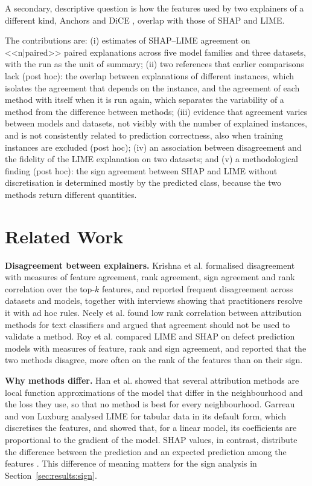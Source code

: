 \documentclass{cys}
\begin{document}
A secondary, descriptive question is how the features used by two explainers of a
different kind, Anchors \cite{ribeiro2018anchors} and DiCE \cite{mothilal2020dice},
overlap with those of SHAP and LIME.

The contributions are: (i) estimates of SHAP--LIME agreement on <<n|paired>> paired
explanations across five model families and three datasets, with the run as the unit of
summary; (ii) two references that earlier comparisons lack (post hoc): the overlap between
explanations of different instances, which isolates the agreement that depends on the
instance, and the
agreement of each method with itself when it is run again, which separates the variability
of a method from the difference between methods; (iii) evidence that agreement varies between
models and datasets, not visibly with the number of explained instances, and is not
consistently related to prediction correctness, also when training instances are
excluded (post hoc); (iv) an association between disagreement and the fidelity of the LIME
explanation on two datasets; and (v) a methodological finding (post hoc): the sign
agreement between SHAP and LIME without discretisation is determined mostly by the
predicted class, because the two methods return different quantities.

\section{Related Work}
\label{sec:related}

\textbf{Disagreement between explainers.} Krishna et al. \cite{krishna2024disagreement}
formalised disagreement with measures of feature agreement, rank agreement, sign
agreement and rank correlation over the top-$k$ features, and reported frequent
disagreement across datasets and models, together with interviews showing that
practitioners resolve it with ad hoc rules. Neely et al. \cite{neely2021order} found low
rank correlation between attribution methods for text classifiers and argued that
agreement should not be used to validate a method. Roy et al. \cite{roy2022why}
compared LIME and SHAP on defect prediction models with measures of feature, rank and
sign agreement, and reported that the two methods disagree, more often on the rank of the
features than on their sign.

\textbf{Why methods differ.} Han et al. \cite{han2022which} showed that several
attribution methods are local function approximations of the model that differ in the
neighbourhood and the loss they use, so that no method is best for every neighbourhood.
Garreau and von Luxburg \cite{garreau2020explaining} analysed LIME for tabular data in
its default form, which discretises the features, and showed that, for a linear model, its
coefficients are proportional to the gradient of the model. SHAP values, in contrast, distribute the difference between the prediction and
an expected prediction among the features \cite{lundberg2017unified,lundberg2020local}.
This difference of meaning matters for the sign analysis in
Section~\ref{sec:results:sign}.
\end{document}
